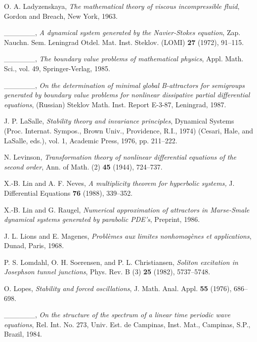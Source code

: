 \documentclass{surv-l}
\theoremstyle{plain}
\theoremstyle{definition}
\numberwithin{equation}{section}
\numberwithin{figure}{chapter}
\begin{document}
\begin{thebibliography}{}
O. A. Ladyzenskaya, \emph{The mathematical theory of viscous incompressible fluid},
Gordon and Breach, New York, 1963.

 \_\_\_\_\_\_, \emph{A dynamical system generated by the Navier-Stokes equation}, Zap. Nauchn. Sem. Leningrad Otdel. Mat. Inst. Steklov. (LOMI) \textbf{27} (1972), 91--115.

 \_\_\_\_\_\_, \emph{The boundary value problems of mathematical physics}, Appl. Math. Sci., vol. 49, Springer-Verlag, 1985.

 \_\_\_\_\_\_, \emph{On the determination of minimal global B-attractors for semigroups generated by boundary value problems for nonlinear dissipative partial differential equations}, (Russian) Steklov Math. Inst. Report E-3-87, Leningrad, 1987.

J. P. LaSalle, \emph{Stability theory and invariance principles}, Dynamical Systems
(Proc. Internat. Sympos., Brown Univ., Providence, R.I., 1974) (Cesari,
Hale, and LaSalle, eds.), vol. 1, Academic Press, 1976, pp. 211--222.

N. Levinson, \emph{Transformation theory of nonlinear differential equations of the}
\emph{second order}, Ann. of Math. (2) \textbf{45} (1944), 724--737.

X.-B. Lin and A. F. Neves, \emph{A multiplicity theorem for hyperbolic systems,}
J. Differential Equations \textbf{76} (1988), 339--352.

X.-B. Lin and G. Raugel, \emph{Numerical approximation of attractors in Marse-Smale dynamical systems generated by parabolic PDE's}, Preprint, 1986.

J. L. Lions and E. Magenes, \emph{Probl\`{e}mes aux limites nonhomog\`{e}nes et applications}, Dunad, Paris, 1968.

P. S. Lomdahl, O. H. Soerensen, and P. L. Christiansen, \emph{Soliton excitation in}
\emph{Josephson tunnel junctions}, Phys. Rev. B (3) \textbf{25} (1982), 5737--5748.

O. Lopes, \emph{Stability and forced oscillations}, J. Math. Anal. Appl. \textbf{55} (1976), 686--698.

 \_\_\_\_\_\_, \emph{On the structure of the spectrum of a linear time periodic wave equations}, Rel. Int. No. 273, Univ. Est. de Campinas, Inst. Mat., Campinas, S.P.,
Brazil, 1984.


\end{thebibliography}
\end{document}
